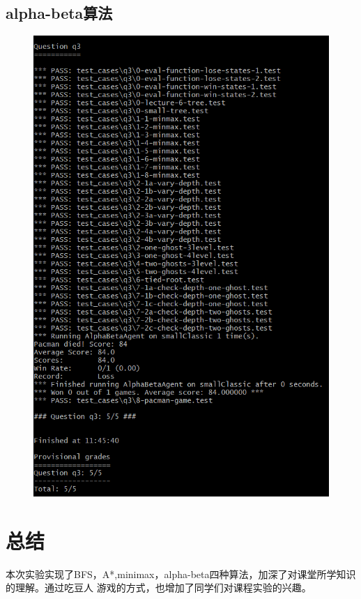 \documentclass{ctexart}
\begin{document}
\subsection{\hei alpha-beta算法}
\begin{figure}[H]	
	\centering	
	\includegraphics[scale=0.6]{ab.png}
		
\end{figure}
\section{\hei 总结}
本次实验实现了BFS，A*,minimax，alpha-beta四种算法，加深了对课堂所学知识的理解。通过吃豆人
游戏的方式，也增加了同学们对课程实验的兴趣。
\end{document}
